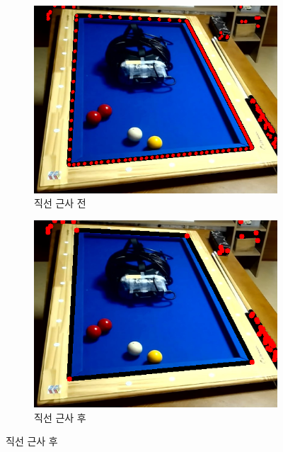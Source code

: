 \documentclass[10pt]{oblivoir}
\begin{document}
\begin{figure}[ht]
    \centering
    \begin{subfigure}{0.4\textwidth}
        \includegraphics[width=\textwidth]{img/billiards-table-contours-dot-view.png}
        \caption{직선 근사 전}
        \label{fig;table-many-dots}
    \end{subfigure}
    \begin{subfigure}{0.4\textwidth}
        \includegraphics[width=\textwidth]{img/billiards-table-contours-dot-view-approx.png}
        \caption{직선 근사 후}
    \end{subfigure}
\end{figure}
\end{document}
